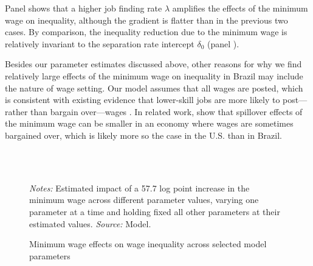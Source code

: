 Panel  shows that a higher job finding rate $\lambda$ amplifies the effects of the minimum wage on inequality, although the gradient is flatter than in the previous two cases. By comparison, the inequality reduction due to the minimum wage is relatively invariant to the separation rate intercept $\delta_{0}$ (panel ).

Besides our parameter estimates discussed above, other reasons for why we find relatively large effects of the minimum wage on inequality in Brazil may include the nature of wage setting. Our model assumes that all wages are posted, which is consistent with existing evidence that lower-skill jobs are more likely to post---rather than bargain over---wages \citep{Hall2012}. In related work, \citet{FlinnMullins2018} show that spillover effects of the minimum wage can be smaller in an economy where wages are sometimes bargained over, which is likely more so the case in the U.S. than in Brazil.

\begin{figure}[!htb]
  \centering
  \caption{Minimum wage effects on wage inequality across selected model parameters\label{figure: robustness}}
  \prefigvspace
  \hspace*{\fill}%
  \centerhfill[\qquad\qquad\qquad\qquad\qquad]
  \hspace*{\fill}
  \\
  \hspace*{\fill}%
  \centerhfill[\qquad\qquad\qquad\qquad\qquad]
  \hspace*{\fill}
  \\
  \postfigvspace
  \begin{minipage}[t]{1\columnwidth}%
    \begin{spacing}{0.75}
      \emph{\scriptsize{}Notes: }{\scriptsize{}Estimated impact of a 57.7 log point increase in the minimum wage across different parameter values, varying one parameter at a time and holding fixed all other parameters at their estimated values. %
      \emph{\scriptsize{}Source: } Model.}
    \end{spacing}
  \end{minipage}
\end{figure}
